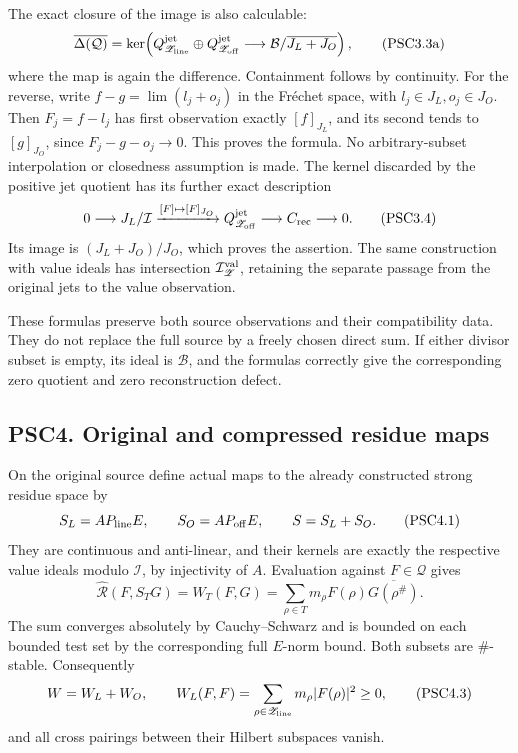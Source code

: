 The exact closure of the image is also calculable: \[
\overline{\Delta(\mathcal Q)}
=\ker\!\left(
Q_{\mathscr Z_{\rm line}}^{\rm jet}\oplus Q_{\mathscr Z_{\rm off}}^{\rm jet}
\longrightarrow \mathcal B/\overline{J_L+J_O}\right),
\tag{PSC3.3a}
\] where the map is again the difference. Containment follows by
continuity. For the reverse, write \(f-g=\lim(l_j+o_j)\) in the Fréchet
space, with \(l_j\in J_L,o_j\in J_O\). Then \(F_j=f-l_j\) has first
observation exactly \([f]_{J_L}\), and its second tends to
\([g]_{J_O}\), since \(F_j-g-o_j\to0\). This proves the formula. No
arbitrary-subset interpolation or closedness assumption is made. The
kernel discarded by the positive jet quotient has its further exact
description \[
0\longrightarrow J_L/\mathcal I
\xrightarrow{[F]\mapsto[F]_{J_O}} Q_{\mathscr Z_{\rm off}}^{\rm jet}
\longrightarrow C_{\rm rec}\longrightarrow0.
\tag{PSC3.4}
\] Its image is \((J_L+J_O)/J_O\), which proves the assertion. The same
construction with value ideals has intersection
\(\mathcal I_{\mathscr Z}^{\rm val}\), retaining the separate passage
from the original jets to the value observation.

These formulas preserve both source observations and their compatibility
data. They do not replace the full source by a freely chosen direct sum.
If either divisor subset is empty, its ideal is \(\mathcal B\), and the
formulas correctly give the corresponding zero quotient and zero
reconstruction defect.

\subsection{PSC4. Original and compressed residue
maps}\label{psc4.-original-and-compressed-residue-maps}

On the original source define actual maps to the already constructed
strong residue space by \[
S_L=AP_{\rm line}E,\qquad S_O=AP_{\rm off}E,\qquad S=S_L+S_O.
\tag{PSC4.1}
\] They are continuous and anti-linear, and their kernels are exactly
the respective value ideals modulo \(\mathcal I\), by injectivity of
\(A\). Evaluation against \(F\in\mathcal Q\) gives \[
\widehat{\mathcal R}(F,S_TG)=W_T(F,G)
=\sum_{\rho\in T}m_\rho F(\rho)\overline{G(\rho^\#)}.
\tag{PSC4.2}
\] The sum converges absolutely by Cauchy--Schwarz and is bounded on
each bounded test set by the corresponding full \(E\)-norm bound. Both
subsets are \(\#\)-stable. Consequently \[
W=W_L+W_O,\qquad W_L(F,F)=\sum_{\rho\in\mathscr Z_{\rm line}}m_\rho|F(\rho)|^2\ge0,
\tag{PSC4.3}
\] and all cross pairings between their Hilbert subspaces vanish.


